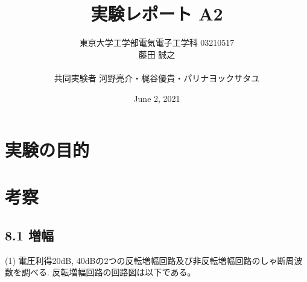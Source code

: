 \documentclass{ltjsarticle}
\title{実験レポート A2}
\author{東京大学工学部電気電子工学科 03210517\\藤田 誠之\\~\\ 共同実験者  河野亮介・梶谷優貴・パリナヨックサタユ}
\date{ June 2, 2021}
\begin{document}
\maketitle

\section{実験の目的}

\section{考察}
\subsection*{8.1 増幅}
(1) 電圧利得20dB, 40dBの2つの反転増幅回路及び非反転増幅回路のしゃ断周波数を調べる. 
反転増幅回路の回路図は以下である。
\end{document}
